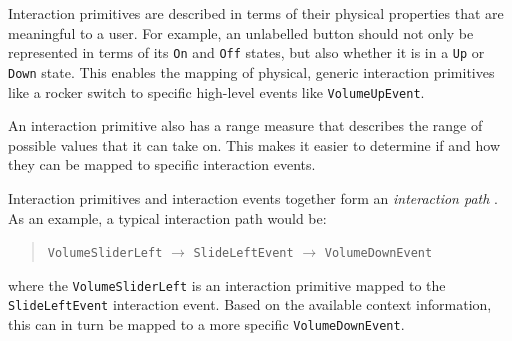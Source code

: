 Interaction primitives are described in terms of their physical properties that are meaningful to a user. For example, an unlabelled button should not only be represented in terms of its \texttt{On} and \texttt{Off} states, but also whether it is in a \texttt{Up} or \texttt{Down} state. This enables the mapping of physical, generic interaction primitives like a rocker switch to specific high-level events like \texttt{VolumeUpEvent}.

An interaction primitive also has a range measure that describes the range of possible values that it can take on. This makes it easier to determine if and how they can be mapped to specific interaction events.

Interaction primitives and interaction events together form an \emph{interaction path} \cite{Dubois2008}. As an example, a typical interaction path would be:
\label{interactionPath}

\begin{quote}\noindent
\texttt{VolumeSliderLeft} $\rightarrow$ \texttt{SlideLeftEvent} $\rightarrow$ \texttt{VolumeDownEvent}
\end{quote}

where the \texttt{VolumeSliderLeft} is an interaction primitive map\-ped to the \texttt{SlideLeftEvent} interaction event. Based on the available context information, this can in turn be mapped to a more specific \texttt{Volume\-Down\-Event}.



